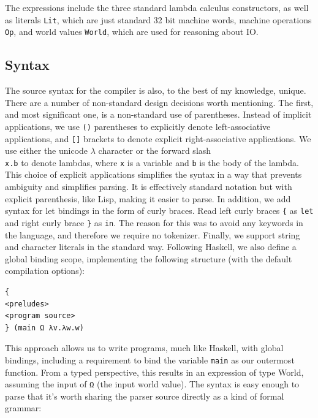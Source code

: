 The expressions include the three standard lambda calculus constructors, as well
as literals \texttt{Lit}, which are just standard 32 bit machine words, machine
operations \texttt{Op}, and world values \texttt{World}, which are used for
reasoning about IO. 

\subsection{Syntax}

The source syntax for the compiler is also, to the best of my knowledge, unique.
There are a number of non-standard design decisions worth mentioning. The first,
and most significant one, is a non-standard use of parentheses. Instead of
implicit applications, we use \texttt{()} parentheses to explicitly denote
left-associative applications, and \texttt{[]} brackets to denote explicit
right-associative applications. We use either the unicode $\lambda$ character or
the forward slash \texttt{\\x.b} to denote lambdas, where \texttt{x} is a
variable and \texttt{b} is the body of the lambda. This choice of explicit
applications simplifies the syntax in a way that prevents ambiguity and
simplifies parsing.  It is effectively standard notation but with explicit
parenthesis, like Lisp, making it easier to parse. In addition, we add syntax
for let bindings in the form of curly braces. Read left curly braces \texttt{\{}
as \texttt{let} and right curly brace \texttt{\}} as \texttt{in}. The reason for
this was to avoid any keywords in the language, and therefore we require no
tokenizer. Finally, we support string and character literals in the standard
way. Following Haskell, we also define a global binding scope, implementing the
following structure (with the default compilation options): 
\begin{verbatim}
{
<preludes>
<program source>
} (main Ω λv.λw.w) 
\end{verbatim}
This approach allows us to write programs, much like Haskell, with global
bindings, including a requirement to bind the variable \texttt{main} as our
outermost function. From a typed perspective, this results in an expression of
type World, assuming the input of \texttt{Ω} (the input world value). The syntax
is easy enough to parse that it's worth sharing the parser source directly as a
kind of formal grammar: 

